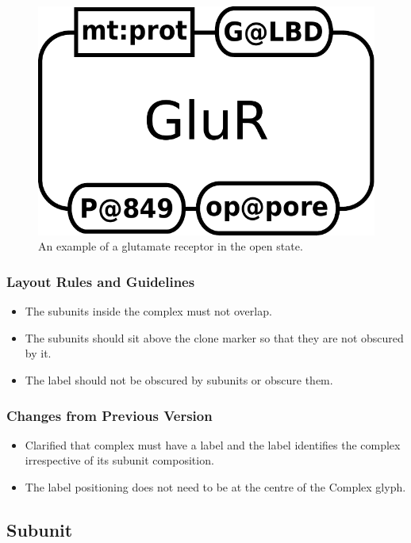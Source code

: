 \begin{figure}[H]
  \centering
  \includegraphics[scale = 0.3]{examples/macromolecule-GluR}
  \caption{An example of a glutamate receptor in the open state.}
  \label{fig:example-glur}
\end{figure}


\subsubsection{Layout Rules and Guidelines}

\begin{itemize}
\item The subunits inside the complex must not overlap.
\item The subunits should sit above the clone marker so that they are
  not obscured by it.
\item The label should not be obscured by subunits or obscure them.
\end{itemize}


\subsubsection{Changes from Previous Version}

\begin{itemize}
\item Clarified that complex must have a label and the label
  identifies the complex irrespective of its subunit composition.
\item The label positioning does not need to be at the centre of the
  Complex glyph.
\end{itemize}

\subsection{Subunit}
\label{defn:Subunit}\label{sec:subunits}

